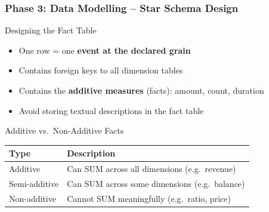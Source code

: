 \begin{frame}
  \frametitle{Phase 3: Data Modelling -- Star Schema Design}

  \begin{block}{Designing the Fact Table}
    \begin{itemize}
      \item One row = one \textbf{event at the declared grain}
      \item Contains foreign keys to all dimension tables
      \item Contains the \textbf{additive measures} (facts): amount, count, duration
      \item Avoid storing textual descriptions in the fact table
    \end{itemize}
  \end{block}

  \begin{block}{Additive vs.\ Non-Additive Facts}
    \begin{tabularx}{\linewidth}{@{}l X@{}}
      \toprule
      \textbf{Type}      & \textbf{Description} \\
      \midrule
      Additive           & Can SUM across all dimensions (e.g.\ revenue) \\
      Semi-additive      & Can SUM across some dimensions (e.g.\ balance) \\
      Non-additive       & Cannot SUM meaningfully (e.g.\ ratio, price) \\
      \bottomrule
    \end{tabularx}
  \end{block}

\end{frame}

